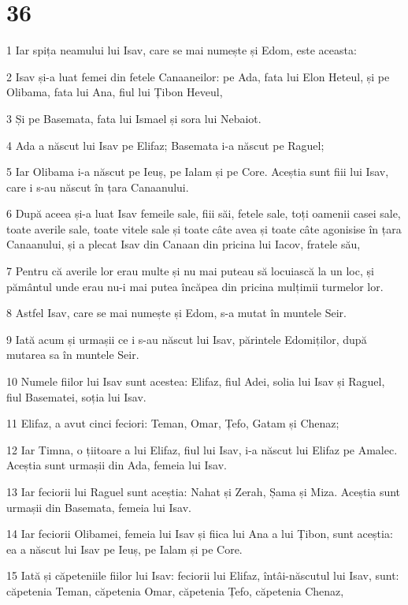 \chapter{36}

\par 1 Iar spița neamului lui Isav, care se mai numește și Edom, este aceasta:
\par 2 Isav și-a luat femei din fetele Canaaneilor: pe Ada, fata lui Elon Heteul, și pe Olibama, fata lui Ana, fiul lui Țibon Heveul,
\par 3 Și pe Basemata, fata lui Ismael și sora lui Nebaiot.
\par 4 Ada a născut lui Isav pe Elifaz; Basemata i-a născut pe Raguel;
\par 5 Iar Olibama i-a născut pe Ieuș, pe Ialam și pe Core. Aceștia sunt fiii lui Isav, care i s-au născut în țara Canaanului.
\par 6 După aceea și-a luat Isav femeile sale, fiii săi, fetele sale, toți oamenii casei sale, toate averile sale, toate vitele sale și toate câte avea și toate câte agonisise în țara Canaanului, și a plecat Isav din Canaan din pricina lui Iacov, fratele său,
\par 7 Pentru că averile lor erau multe și nu mai puteau să locuiască la un loc, și pământul unde erau nu-i mai putea încăpea din pricina mulțimii turmelor lor.
\par 8 Astfel Isav, care se mai numește și Edom, s-a mutat în muntele Seir.
\par 9 Iată acum și urmașii ce i s-au născut lui Isav, părintele Edomiților, după mutarea sa în muntele Seir.
\par 10 Numele fiilor lui Isav sunt acestea: Elifaz, fiul Adei, solia lui Isav și Raguel, fiul Basematei, soția lui Isav.
\par 11 Elifaz, a avut cinci feciori: Teman, Omar, Țefo, Gatam și Chenaz;
\par 12 Iar Timna, o țiitoare a lui Elifaz, fiul lui Isav, i-a născut lui Elifaz pe Amalec. Aceștia sunt urmașii din Ada, femeia lui Isav.
\par 13 Iar feciorii lui Raguel sunt aceștia: Nahat și Zerah, Șama și Miza. Aceștia sunt urmașii din Basemata, femeia lui Isav.
\par 14 Iar feciorii Olibamei, femeia lui Isav și fiica lui Ana a lui Țibon, sunt aceștia: ea a născut lui Isav pe Ieuș, pe Ialam și pe Core.
\par 15 Iată și căpeteniile fiilor lui Isav: feciorii lui Elifaz, întâi-născutul lui Isav, sunt: căpetenia Teman, căpetenia Omar, căpetenia Țefo, căpetenia Chenaz,
